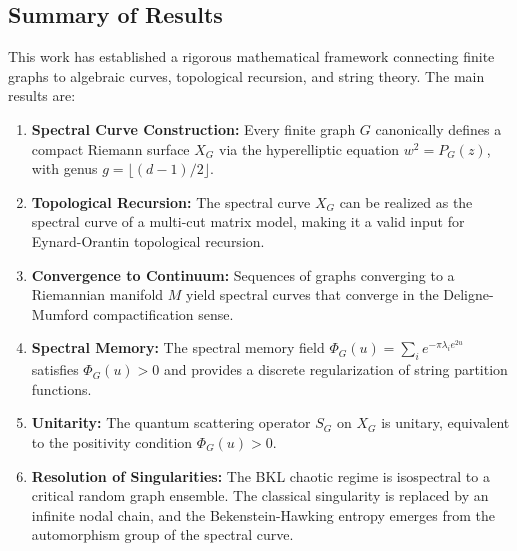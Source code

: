 \documentclass[12pt]{article}
\theoremstyle{definition}
\begin{document}
\subsection{Summary of Results}
This work has established a rigorous mathematical framework connecting finite graphs to algebraic curves, topological recursion, and string theory. The main results are:

\begin{enumerate}
\item \textbf{Spectral Curve Construction:} Every finite graph $G$ canonically defines a compact Riemann surface $X_G$ via the hyperelliptic equation $w^2 = P_G(z)$, with genus $g = \lfloor(d-1)/2\rfloor$.
\item \textbf{Topological Recursion:} The spectral curve $X_G$ can be realized as the spectral curve of a multi-cut matrix model, making it a valid input for Eynard-Orantin topological recursion.
\item \textbf{Convergence to Continuum:} Sequences of graphs converging to a Riemannian manifold $M$ yield spectral curves that converge in the Deligne-Mumford compactification sense.
\item \textbf{Spectral Memory:} The spectral memory field $\Phi_G(u) = \sum_i e^{-\pi \lambda_i e^{2u}}$ satisfies $\Phi_G(u) > 0$ and provides a discrete regularization of string partition functions.
\item \textbf{Unitarity:} The quantum scattering operator $S_G$ on $X_G$ is unitary, equivalent to the positivity condition $\Phi_G(u) > 0$.
\item \textbf{Resolution of Singularities:} The BKL chaotic regime is isospectral to a critical random graph ensemble. The classical singularity is replaced by an infinite nodal chain, and the Bekenstein-Hawking entropy emerges from the automorphism group of the spectral curve.
\end{enumerate}
\end{document}
